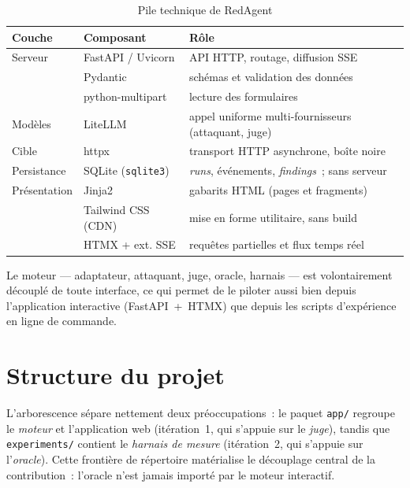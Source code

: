 \begin{table}[H]
  \centering
  \caption{Pile technique de RedAgent}
  \label{tab:stack}
  \begin{tabular}{@{}lll@{}}
    \toprule
    \textbf{Couche} & \textbf{Composant} & \textbf{Rôle} \\
    \midrule
    Serveur      & FastAPI / Uvicorn   & API HTTP, routage, diffusion SSE \\
                 & Pydantic            & schémas et validation des données \\
                 & python-multipart    & lecture des formulaires \\
    Modèles      & LiteLLM             & appel uniforme multi-fournisseurs (attaquant, juge) \\
    Cible        & httpx               & transport HTTP asynchrone, boîte noire \\
    Persistance  & SQLite (\texttt{sqlite3}) & \emph{runs}, événements, \emph{findings}~; sans serveur \\
    Présentation & Jinja2              & gabarits HTML (pages et fragments) \\
                 & Tailwind CSS (CDN)  & mise en forme utilitaire, sans build \\
                 & HTMX + ext. SSE     & requêtes partielles et flux temps réel \\
    \bottomrule
  \end{tabular}
\end{table}

\noindent Le moteur — adaptateur, attaquant, juge, oracle, harnais — est volontairement découplé de toute interface, ce qui permet de le piloter aussi bien depuis l'application interactive (FastAPI~+~HTMX) que depuis les scripts d'expérience en ligne de commande.

\section{Structure du projet}

L'arborescence sépare nettement deux préoccupations~: le paquet \texttt{app/} regroupe le \emph{moteur} et l'application web (itération~1, qui s'appuie sur le \emph{juge}), tandis que \texttt{experiments/} contient le \emph{harnais de mesure} (itération~2, qui s'appuie sur l'\emph{oracle}). Cette frontière de répertoire matérialise le découplage central de la contribution~: l'oracle n'est jamais importé par le moteur interactif.

